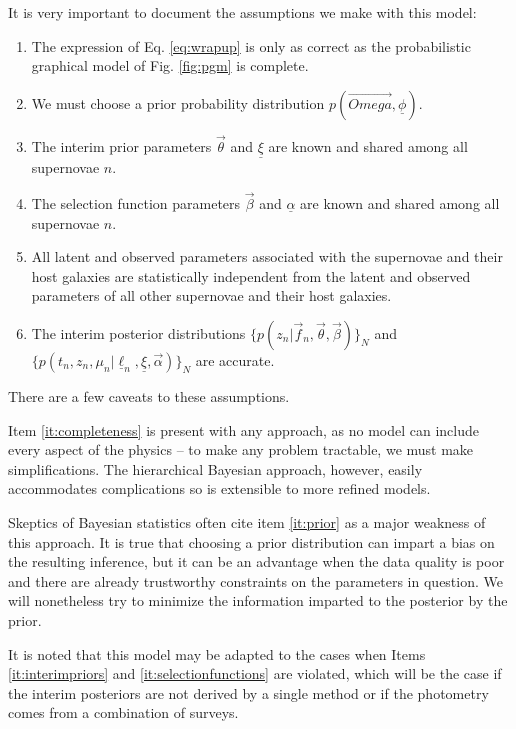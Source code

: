 \documentclass[12pt, onecolumn]{emulateapj}
\newcommand{\textul}{\underline}
\begin{document}
It is very important to document the assumptions we make with this model:
\begin{enumerate}
	\item\label{it:completeness} The expression of Eq. \ref{eq:wrapup} is only as correct as the probabilistic graphical model of Fig. \ref{fig:pgm} is complete.
	\item\label{it:prior} We must choose a prior probability distribution $p(\vec{Omega}, \textul{\phi})$.
	\item\label{it:interimpriors} The interim prior parameters $\vec{\theta}$ and $\textul{\xi}$ are known and shared among all supernovae $n$.
	\item\label{it:selectionfunctions} The selection function parameters $\vec{\beta}$ and $\textul{\alpha}$ are known and shared among all supernovae $n$.
	\item\label{it:independence} All latent and observed parameters associated with the supernovae and their host galaxies are statistically independent from the latent and observed parameters of all other supernovae and their host galaxies.
	\item\label{it:accuracy} The interim posterior distributions $\{p(z_{n} | \vec{f}_{n}, \vec{\theta}, \vec{\beta})\}_{N}$ and $\{p(t_{n}, z_{n}, \mu_{n} | \textul{\ell}_{n}, \textul{\xi}, \vec{\alpha})\}_{N}$ are accurate.
\end{enumerate}
There are a few caveats to these assumptions.  

Item \ref{it:completeness} is present with any approach, as no model can include every aspect of the physics -- to make any problem tractable, we must make simplifications.  The hierarchical Bayesian approach, however, easily accommodates complications so is extensible to more refined models.

Skeptics of Bayesian statistics often cite item \ref{it:prior} as a major weakness of this approach.  It is true that choosing a prior distribution can impart a bias on the resulting inference, but it can be an advantage when the data quality is poor and there are already trustworthy constraints on the parameters in question.  We will nonetheless try to minimize the information imparted to the posterior by the prior.

It is noted that this model may be adapted to the cases when Items \ref{it:interimpriors} and \ref{it:selectionfunctions} are violated, which will be the case if the interim posteriors are not derived by a single method or if the photometry comes from a combination of surveys.  
\end{document}
